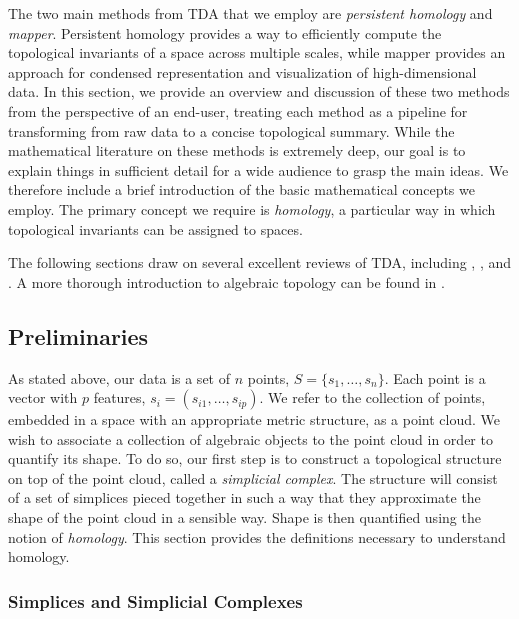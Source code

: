 The two main methods from TDA that we employ are \emph{persistent homology} and \emph{mapper}.
Persistent homology provides a way to efficiently compute the topological invariants of a space across multiple scales, while mapper provides an approach for condensed representation and visualization of high-dimensional data.
In this section, we provide an overview and discussion of these two methods from the perspective of an end-user, treating each method as a pipeline for transforming from raw data to a concise topological summary.
While the mathematical literature on these methods is extremely deep, our goal is to explain things in sufficient detail for a wide audience to grasp the main ideas.
We therefore include a brief introduction of the basic mathematical concepts we employ.
The primary concept we require is \emph{homology}, a particular way in which topological invariants can be assigned to spaces.

The following sections draw on several excellent reviews of TDA, including \cite{Carlsson:2009a}, \cite{Edelsbrunner:2010}, and \cite{Ghrist:2008}.
A more thorough introduction to algebraic topology can be found in \cite{Hatcher:2002ut}.

\subsection{Preliminaries}
\label{bg:tda:math}

As stated above, our data is a set of $n$ points, $S=\{s_1,\ldots,s_n\}$.
Each point is a vector with $p$ features, $s_i=(s_{i1},\ldots,s_{ip})$.
We refer to the collection of points, embedded in a space with an appropriate metric structure, as a point cloud.
We wish to associate a collection of algebraic objects to the point cloud in order to quantify its shape.
To do so, our first step is to construct a topological structure on top of the point cloud, called a \emph{simplicial complex}.
The structure will consist of a set of simplices pieced together in such a way that they approximate the shape of the point cloud in a sensible way.
Shape is then quantified using the notion of \emph{homology}.
This section provides the definitions necessary to understand homology.

\subsubsection{Simplices and Simplicial Complexes}
\label{bg:tda:math:simplices}

